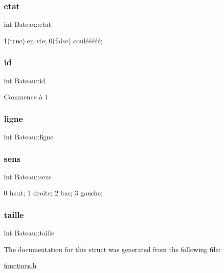 \subsubsection{\texorpdfstring{etat}{etat}}
{\footnotesize\ttfamily int Bateau\+::etat}

1(true) en vie; 0(false) coulééééé; \hypertarget{structBateau_afc8b5863d722d86e00511dcae976220d}{}\label{structBateau_afc8b5863d722d86e00511dcae976220d} 
\subsubsection{\texorpdfstring{id}{id}}
{\footnotesize\ttfamily int Bateau\+::id}

Commence à 1 \hypertarget{structBateau_ae8d7a76573b9e27c1e72a15832b9d6f3}{}\label{structBateau_ae8d7a76573b9e27c1e72a15832b9d6f3} 
\subsubsection{\texorpdfstring{ligne}{ligne}}
{\footnotesize\ttfamily int Bateau\+::ligne}

\hypertarget{structBateau_a887a8ad2ee59ffd987eb5f9d117e83a2}{}\label{structBateau_a887a8ad2ee59ffd987eb5f9d117e83a2} 
\subsubsection{\texorpdfstring{sens}{sens}}
{\footnotesize\ttfamily int Bateau\+::sens}

0 haut; 1 droite; 2 bas; 3 gauche; \hypertarget{structBateau_a1dd818ea44eed67f756400eaac344a95}{}\label{structBateau_a1dd818ea44eed67f756400eaac344a95} 
\subsubsection{\texorpdfstring{taille}{taille}}
{\footnotesize\ttfamily int Bateau\+::taille}



The documentation for this struct was generated from the following file\+:\begin{DoxyCompactItemize}
\item 
\hyperlink{fonctions_8h}{fonctions.\+h}\end{DoxyCompactItemize}
